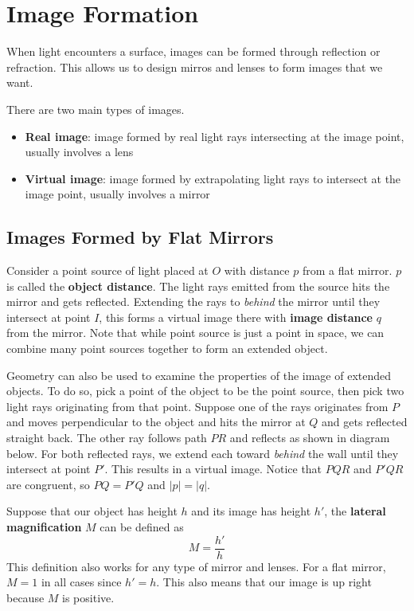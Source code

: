 \chapter{Image Formation}

When light encounters a surface, images can be formed through reflection or refraction.
This allows us to design mirros and lenses to form images that we want.

There are two main types of images.
\begin{itemize}
    \item \textbf{Real image}: image formed by real light rays intersecting at the image point,
        usually involves a lens
    \item \textbf{Virtual image}: image formed by extrapolating light rays to intersect at the 
        image point, usually involves a mirror
\end{itemize}

\section{Images Formed by Flat Mirrors}

Consider a point source of light placed at $O$ with distance $p$ from a flat mirror. $p$ is called 
the \textbf{object distance}. The light rays emitted from the source hits the mirror and gets
reflected. Extending the rays to \textit{behind} the mirror until they intersect at point $I$,
this forms a virtual image there with \textbf{image distance} $q$ from the mirror.
Note that while point source is just a point in space, we can combine many point sources together
to form an extended object.

Geometry can also be used to examine the properties of the image of extended objects. To do so,
pick a point of the object to be the point source, then pick two light rays originating from that point.
Suppose one of the rays originates from $P$ and moves perpendicular to the object and hits the mirror
at $Q$ and gets reflected straight back. The other ray follows path $PR$ and reflects as shown in
diagram below. For both reflected rays, we extend each toward \textit{behind} the wall until 
they intersect at point $P'$. This results in a virtual image.
Notice that $PQR$ and $P'QR$ are congruent, so $PQ = P'Q$ and $|p| = |q|$.

Suppose that our object has height $h$ and its image has height $h'$, the \textbf{lateral
magnification} $M$ can be defined as
\begin{equation}\label{36.1}
    M = \frac{h'}{h}
\end{equation}
This definition also works for any type of mirror and lenses. For a flat mirror, $M = 1$ in all cases
since $h' = h$. This also means that our image is up right because $M$ is positive.

